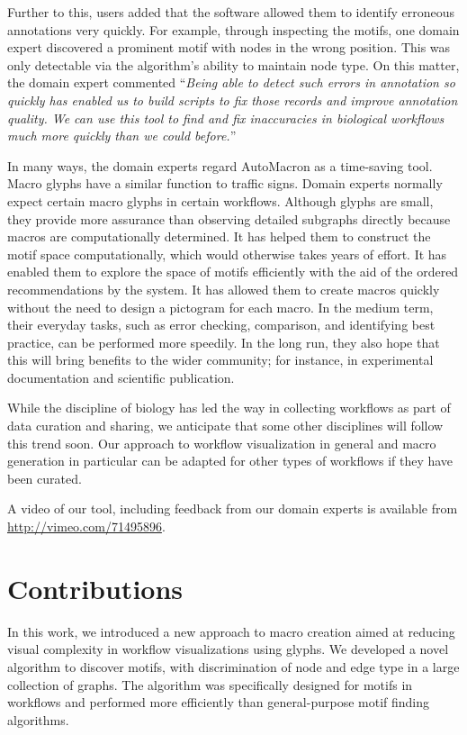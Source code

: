 \vspace{-1mm}
Further to this, users added that the software allowed them to identify erroneous annotations very quickly.
For example, through inspecting the motifs, one domain expert discovered a prominent motif with nodes in the wrong position.
This was only detectable via the algorithm's ability to maintain node type.
On this matter, the domain expert commented ``\emph{Being able to detect such errors in annotation so quickly has enabled us to build scripts to fix those records and improve annotation quality.
We can use this tool to find and fix inaccuracies in biological workflows much more quickly than we could before.}''

In many ways, the domain experts regard AutoMacron as a time-saving tool.
Macro glyphs have a similar function to traffic signs.
Domain experts normally expect certain macro glyphs in certain workflows.
Although glyphs are small, they provide more assurance than observing detailed subgraphs directly because macros are computationally determined.
It has helped them to construct the motif space computationally, which would otherwise takes years of effort.
It has enabled them to explore the space of motifs efficiently with the aid of the ordered recommendations by the system.
It has allowed them to create macros quickly without the need to design a pictogram for each macro.
In the medium term, their everyday tasks, such as error checking, comparison, and identifying best practice, can be performed more speedily.
In the long run, they also hope that this will bring benefits to the wider community; for instance, in experimental documentation and scientific publication.

While the discipline of biology has led the way in collecting workflows as part of data curation and sharing, we anticipate that some other disciplines will follow this trend soon.
Our approach to workflow visualization in general and macro generation in particular can be adapted for other types of workflows if they have been curated.

A video of our tool, including feedback from our domain experts is available from \url{http://vimeo.com/71495896}.
 
\section{Contributions}

In this work, we introduced a new approach to macro creation aimed at reducing visual complexity in workflow visualizations using glyphs.
We developed a novel algorithm to discover motifs, with discrimination of node and edge type in a large collection of graphs.
The algorithm was specifically designed for motifs in workflows and performed more efficiently than general-purpose motif finding algorithms. 

